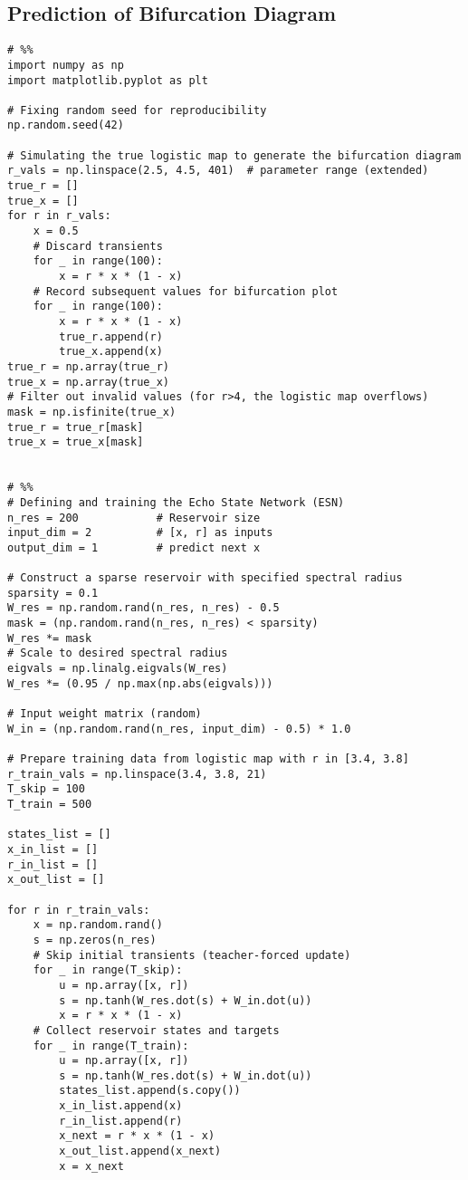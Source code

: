 \subsection*{Prediction of Bifurcation Diagram} \label{code_elm_bd}
\begin{verbatim}
# %%
import numpy as np
import matplotlib.pyplot as plt

# Fixing random seed for reproducibility
np.random.seed(42)

# Simulating the true logistic map to generate the bifurcation diagram
r_vals = np.linspace(2.5, 4.5, 401)  # parameter range (extended)
true_r = []
true_x = []
for r in r_vals:
    x = 0.5
    # Discard transients
    for _ in range(100):
        x = r * x * (1 - x)
    # Record subsequent values for bifurcation plot
    for _ in range(100):
        x = r * x * (1 - x)
        true_r.append(r)
        true_x.append(x)
true_r = np.array(true_r)
true_x = np.array(true_x)
# Filter out invalid values (for r>4, the logistic map overflows)
mask = np.isfinite(true_x)
true_r = true_r[mask]
true_x = true_x[mask]


# %%
# Defining and training the Echo State Network (ESN)
n_res = 200            # Reservoir size
input_dim = 2          # [x, r] as inputs
output_dim = 1         # predict next x

# Construct a sparse reservoir with specified spectral radius
sparsity = 0.1
W_res = np.random.rand(n_res, n_res) - 0.5
mask = (np.random.rand(n_res, n_res) < sparsity)
W_res *= mask
# Scale to desired spectral radius
eigvals = np.linalg.eigvals(W_res)
W_res *= (0.95 / np.max(np.abs(eigvals)))

# Input weight matrix (random)
W_in = (np.random.rand(n_res, input_dim) - 0.5) * 1.0

# Prepare training data from logistic map with r in [3.4, 3.8]
r_train_vals = np.linspace(3.4, 3.8, 21)
T_skip = 100
T_train = 500

states_list = []
x_in_list = []
r_in_list = []
x_out_list = []

for r in r_train_vals:
    x = np.random.rand()
    s = np.zeros(n_res)
    # Skip initial transients (teacher-forced update)
    for _ in range(T_skip):
        u = np.array([x, r])
        s = np.tanh(W_res.dot(s) + W_in.dot(u))
        x = r * x * (1 - x)
    # Collect reservoir states and targets
    for _ in range(T_train):
        u = np.array([x, r])
        s = np.tanh(W_res.dot(s) + W_in.dot(u))
        states_list.append(s.copy())
        x_in_list.append(x)
        r_in_list.append(r)
        x_next = r * x * (1 - x)
        x_out_list.append(x_next)
        x = x_next


\end{verbatim}
